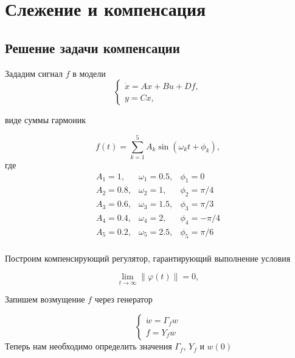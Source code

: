 \chapter{Слежение и компенсация}
\label{ch:chap5}

\section{Решение задачи компенсации}
Зададим сигнал $f$ в модели
\begin{equation}
    \begin{cases}
       \dot{x} = Ax + Bu + Df,\\
     y=Cx,  
    \end{cases}
\end{equation}

виде суммы гармоник

\begin{equation}
    f(t) = \sum \limits_{k=1}^5 A_k \sin(\omega_kt+\phi_k),
\end{equation}
где
\begin{equation}
    \begin{matrix}
        A_1 = 1, & \omega_1 = 0.5, & \phi_1 = 0\\
        A_2 = 0.8, & \omega_2 = 1, & \phi_2 = \pi /4\\
        A_3 = 0.6, & \omega_3 = 1.5, & \phi_3 = \pi /3\\
        A_4 = 0.4, & \omega_4 = 2, & \phi_4 = -\pi/4\\
        A_5= 0.2, & \omega_5 = 2.5, & \phi_5 = \pi / 6\\
    \end{matrix}
\end{equation}

Построим компенсирующий регулятор, гарантирующий выполнение условия

\begin{equation}
\label{5_goal_1}
    \lim \limits_{t \to \infty} \| \varphi(t) \| = 0,
\end{equation}



Запишем возмущение $f$ через генератор

\begin{equation}
    \begin{cases}
        \dot{w} = \Gamma_f w\\
        f = Y_fw
    \end{cases}
\end{equation}
Теперь нам необходимо определить значения $\Gamma_f$, $Y_f$ и $w(0)$

